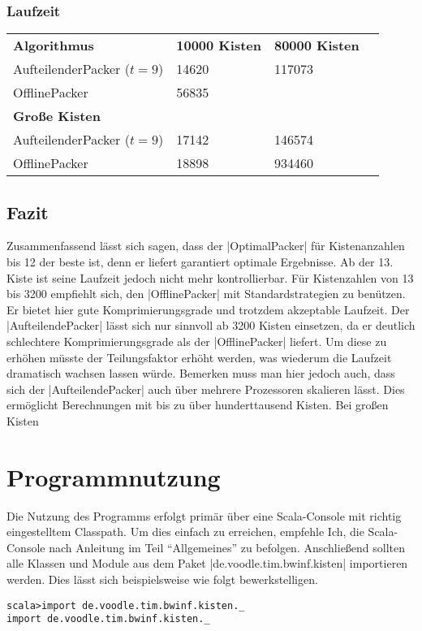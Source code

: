 \subsubsection*{Laufzeit}
\begin{tabular}{llll}
\textbf{Algorithmus} 	& \textbf{10000 Kisten} & \textbf{80000 Kisten} \\
 AufteilenderPacker ($t=9$)  	& 14620		& 117073		\\
 OfflinePacker			& 56835		& 			\vspace*{.48em} \\
\textbf{Große Kisten} & & \\
 AufteilenderPacker ($t=9$)  	& 17142		& 146574		\\
 OfflinePacker			& 18898		& 934460		\\
\end{tabular}

\subsection{Fazit}
Zusammenfassend lässt sich sagen, dass der |OptimalPacker| für Kistenanzahlen bis 12 der beste ist, denn er liefert garantiert optimale Ergebnisse.
Ab der 13. Kiste ist seine Laufzeit jedoch nicht mehr kontrollierbar.
Für Kistenzahlen von 13 bis 3200 empfiehlt sich, den |OfflinePacker| mit Standardstrategien zu benützen.
Er bietet hier gute Komprimierungsgrade und trotzdem akzeptable Laufzeit.
Der |AufteilendePacker| lässt sich nur sinnvoll ab 3200 Kisten einsetzen, da er deutlich schlechtere Komprimierungsgrade als der |OfflinePacker| liefert.
Um diese zu erhöhen müsste der Teilungsfaktor erhöht werden, was wiederum die Laufzeit dramatisch wachsen lassen würde.
Bemerken muss man hier jedoch auch, dass sich der |AufteilendePacker| auch über mehrere Prozessoren skalieren lässt.
Dies ermöglicht Berechnungen mit bis zu über hunderttausend Kisten.
Bei großen Kisten 

\clearpage
\section{Programmnutzung}
\lstset{basicstyle=\ttfamily}
Die Nutzung des Programms erfolgt primär über eine Scala-Console mit richtig eingestelltem Classpath.
Um dies einfach zu erreichen, empfehle Ich, die Scala-Console nach Anleitung im Teil ``Allgemeines'' zu befolgen.
Anschließend sollten alle Klassen und Module aus dem Paket |de.voodle.tim.bwinf.kisten| importieren werden.
Dies lässt sich beispielsweise wie folgt bewerkstelligen.
\begin{lstlisting}
scala>import de.voodle.tim.bwinf.kisten._
import de.voodle.tim.bwinf.kisten._

\end{lstlisting}
